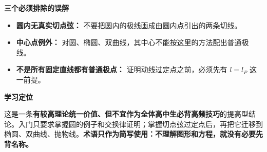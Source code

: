 \begin{summarybox}
\begin{minipage}{\linewidth}
\end{minipage}\par
\medskip
\textbf{\textcolor{CSummary}{三个必须排除的误解}}
\begin{itemize}[leftmargin=*,itemsep=0.3em]
\item \textbf{圆内无真实切点弦：} 不要把圆内的极线画成由圆内点引出的两条切线。
\item \textbf{中心点例外：} 对圆、椭圆、双曲线，其中心不能按这里的方法配出普通极线。
\item \textbf{不是所有固定直线都有普通极点：} 证明动线过定点之前，必须先有 $l=l_P$ 这一前提。
\end{itemize}

\medskip
\textbf{\textcolor{CSummary}{学习定位}}

这是一条\textbf{有较高理论统一价值、但不宜作为全体高中生必背高频技巧}的提高型结论。入门只要求掌握圆的例子和交换律证明；掌握切点弦过定点后，再把它迁移到椭圆、双曲线、抛物线。\textbf{术语只作为简写使用：不理解图形和方程，就没有必要先背名称。}
\end{summarybox}
